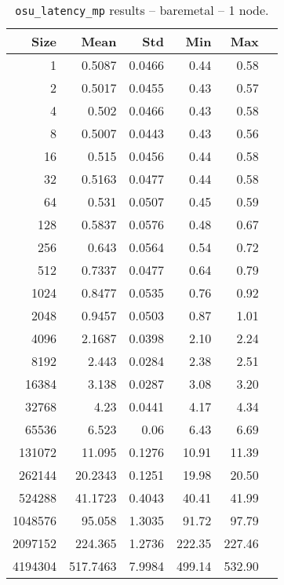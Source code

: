 \begin{table}[htbp]
  \centering
  \begin{minipage}{.48\textwidth}
    \centering
    \footnotesize
  \begin{tabular}{rrrrrr}
	\toprule
	\textbf{Size} & \textbf{Mean} & \textbf{Std} & \textbf{Min} & \textbf{Max}	\\
	\midrule
	1	&	0.5087   	&	0.0466	&	0.44	&	0.58	\\
	2	&	0.5017   	&	0.0455	&	0.43	&	0.57	\\
	4	&	0.502   	&	0.0466	&	0.43	&	0.58	\\
	8	&	0.5007   	&	0.0443	&	0.43	&	0.56	\\
	16	&	0.515   	&	0.0456	&	0.44	&	0.58	\\
	32	&	0.5163   	&	0.0477	&	0.44	&	0.58	\\
	64	&	0.531   	&	0.0507	&	0.45	&	0.59	\\
	128	&	0.5837   	&	0.0576	&	0.48	&	0.67	\\
	256	&	0.643   	&	0.0564	&	0.54	&	0.72	\\
	512	&	0.7337   	&	0.0477	&	0.64	&	0.79	\\
	1024	&	0.8477   	&	0.0535	&	0.76	&	0.92	\\
	2048	&	0.9457   	&	0.0503	&	0.87	&	1.01	\\
	4096	&	2.1687   	&	0.0398	&	2.10	&	2.24	\\
	8192	&	2.443   	&	0.0284	&	2.38	&	2.51	\\
	16384	&	3.138   	&	0.0287	&	3.08	&	3.20	\\
	32768	&	4.23   	&	0.0441	&	4.17	&	4.34	\\
	65536	&	6.523   	&	0.06	&	6.43	&	6.69	\\
	131072	&	11.095   	&	0.1276	&	10.91	&	11.39	\\
	262144	&	20.2343   	&	0.1251	&	19.98	&	20.50	\\
	524288	&	41.1723   	&	0.4043	&	40.41	&	41.99	\\
	1048576	&	95.058   	&	1.3035	&	91.72	&	97.79	\\
	2097152	&	224.365   	&	1.2736	&	222.35	&	227.46	\\
	4194304	&	517.7463   	&	7.9984	&	499.14	&	532.90	\\
	\bottomrule
	\end{tabular}
  \caption{\texttt{osu\_latency\_mp} results -- baremetal -- 1 node.}
  \label{tab:latency-mp-baremetal-1nodes}
  \end{minipage}
\hfill
\begin{minipage}{.48\textwidth}

\end{minipage}
\end{table}
